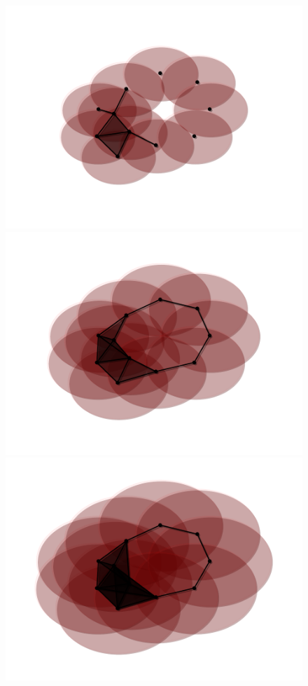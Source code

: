 \begin{figure}[htbp]
\centering
    \includegraphics[scale=0.4]{figures/persist06.pdf}
    \includegraphics[scale=0.4]{figures/persist08.pdf}
    \includegraphics[scale=0.4]{figures/persist10.pdf}

\end{figure}
